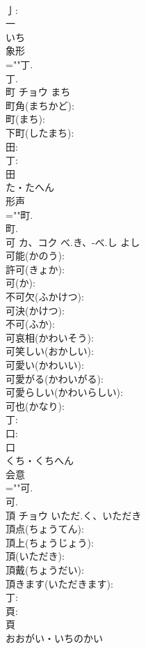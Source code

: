 \documentclass[8pt]{extreport}
\begin{document}
\begin{CJK}{UTF8}{min}
\\	亅: 
\\	一	
\\	いち	
\\	象形 
\\	=""丁.
\\	丁.
\\	町	チョウ	まち		
\\	町角(まちかど): 
\\	町(まち): 
\\	下町(したまち): 
\\	田: 
\\	丁: 
\\	田	
\\	た・たへん	
\\	形声 
\\	=""町.
\\	町.
\\	可	カ、コク	べ.き、-べ.し	よし	
\\	可能(かのう): 
\\	許可(きょか): 
\\	可(か): 
\\	不可欠(ふかけつ): 
\\	可決(かけつ): 
\\	不可(ふか): 
\\	可哀相(かわいそう): 
\\	可笑しい(おかしい): 
\\	可愛い(かわいい): 
\\	可愛がる(かわいがる): 
\\	可愛らしい(かわいらしい): 
\\	可也(かなり): 
\\	丁: 
\\	口: 
\\	口	
\\	くち・くちへん	
\\	会意 
\\	=""可.
\\	可.
\\	頂	チョウ	いただ.く、いただき		
\\	頂点(ちょうてん): 
\\	頂上(ちょうじょう): 
\\	頂(いただき): 
\\	頂戴(ちょうだい): 
\\	頂きます(いただきます): 
\\	丁: 
\\	頁: 
\\	頁	
\\	おおがい・いちのかい	

\end{CJK}
\end{document}
